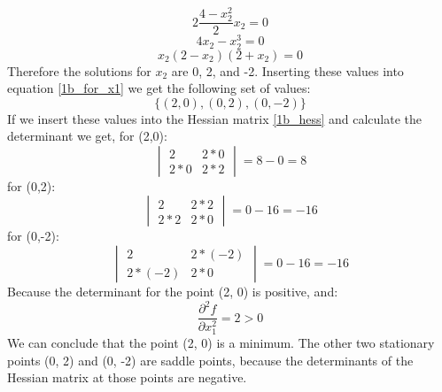 \documentclass{article}
\begin{document}
\begin{equation*}
    2 \frac{4-x_2^2}{2} x_2 = 0
\end{equation*}
\begin{equation*}
    4x_2 - x_2^3 = 0
\end{equation*}
\begin{equation*}
    x_2(2-x_2)(2+x_2) = 0
\end{equation*}
Therefore the solutions for $x_2$ are 0, 2, and -2. Inserting these values into equation \eqref{1b_for_x1} we get the following set of values:
\begin{equation*}
    \{(2,0), (0,2), (0, -2)\}
\end{equation*}
If we insert these values into the Hessian matrix \eqref{1b_hess} and calculate the determinant we get, for (2,0):
\begin{equation*}
\begin{vmatrix}
    2 & 2*0\\ 2*0 & 2*2 
\end{vmatrix}
= 8 - 0 = 8
\end{equation*}
for (0,2):
\begin{equation*}
\begin{vmatrix}
    2 & 2*2\\ 2*2 & 2*0 
\end{vmatrix}
= 0 - 16 = -16
\end{equation*}
for (0,-2):
\begin{equation*}
\begin{vmatrix}
    2 & 2*(-2)\\ 2*(-2) & 2*0 
\end{vmatrix}
= 0 - 16 = -16
\end{equation*}
Because the determinant for the point (2, 0) is positive, and:
\begin{equation*}
    \frac{\partial ^2 f}{\partial x_1^2} = 2 > 0
\end{equation*}
We can conclude that the point (2, 0) is a minimum. The other two stationary points (0, 2) and (0, -2) are saddle points, because the determinants of the Hessian matrix at those points are negative. \\
\end{document}
